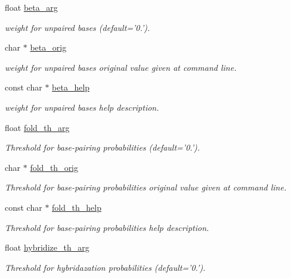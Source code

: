 \begin{DoxyCompactItemize}
float \hyperlink{structgengetopt__args__info_af10d11b97a09ce5f90816f475f099383}{beta\+\_\+arg}
\begin{DoxyCompactList}\small\item\em weight for unpaired bases (default='0.'). \end{DoxyCompactList}\item 
char $\ast$ \hyperlink{structgengetopt__args__info_a13737dc4f85cd3276f8cbb66e796a11d}{beta\+\_\+orig}
\begin{DoxyCompactList}\small\item\em weight for unpaired bases original value given at command line. \end{DoxyCompactList}\item 
const char $\ast$ \hyperlink{structgengetopt__args__info_a4a10c9f1eac9e95ee84071c2c42924ac}{beta\+\_\+help}
\begin{DoxyCompactList}\small\item\em weight for unpaired bases help description. \end{DoxyCompactList}\item 
float \hyperlink{structgengetopt__args__info_a7b854a8200daa4d15745ae98b20f30f6}{fold\+\_\+th\+\_\+arg}
\begin{DoxyCompactList}\small\item\em Threshold for base-\/pairing probabilities (default='0.'). \end{DoxyCompactList}\item 
char $\ast$ \hyperlink{structgengetopt__args__info_a281837484d9e42893a583d0a850cd610}{fold\+\_\+th\+\_\+orig}
\begin{DoxyCompactList}\small\item\em Threshold for base-\/pairing probabilities original value given at command line. \end{DoxyCompactList}\item 
const char $\ast$ \hyperlink{structgengetopt__args__info_a91fb17190d2ee0c11ba6c6ac16a8be5e}{fold\+\_\+th\+\_\+help}
\begin{DoxyCompactList}\small\item\em Threshold for base-\/pairing probabilities help description. \end{DoxyCompactList}\item 
float \hyperlink{structgengetopt__args__info_ae8618e9bfeb0de8e9b095ecec22af5c5}{hybridize\+\_\+th\+\_\+arg}
\begin{DoxyCompactList}\small\item\em Threshold for hybridazation probabilities (default='0.'). \end{DoxyCompactList}\item 

\end{DoxyCompactItemize}
